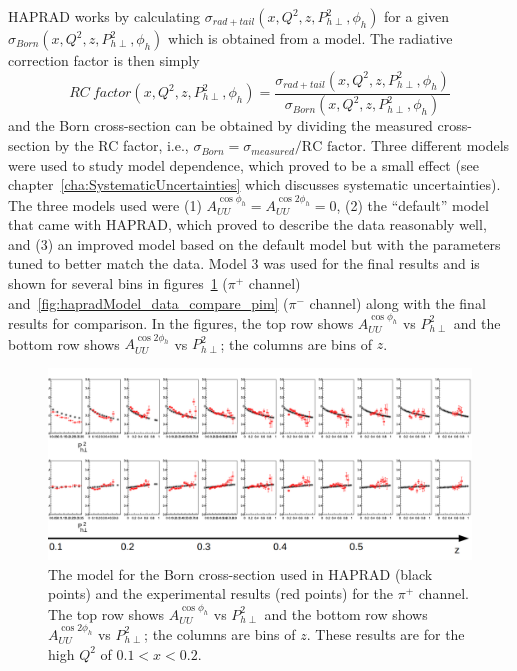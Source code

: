 HAPRAD works by calculating $\sigma_{rad+tail} \left( x, Q^2, z, P_{h\perp}^2, \phi_h \right)$ for a given \allowbreak $\sigma_{Born} \left( x, Q^2, z, P_{h\perp}^2, \phi_h \right)$ which is obtained from a model.
The radiative correction factor is then simply
\begin{equation}
\label{eq:RCfactor}
RC\ factor \left( x, Q^2, z, P_{h\perp}^2, \phi_h \right) = \frac{\sigma_{rad+tail} \left( x, Q^2, z, P_{h\perp}^2, \phi_h \right)}{\sigma_{Born} \left( x, Q^2, z, P_{h\perp}^2, \phi_h \right)}
\end{equation}
and the Born cross-section can be obtained by dividing the measured cross-section by the RC factor, i.e., $\sigma_{Born} = \sigma_{measured}/\text{RC factor}$.
Three different models were used to study model dependence, which proved to be a small effect (see chapter~\ref{cha:SystematicUncertainties} which discusses systematic uncertainties).
The three models used were (1) $A_{UU}^{\cos \phi_h} = A_{UU}^{\cos 2\phi_h} = 0$, (2) the ``default'' model that came with HAPRAD, which proved to describe the data reasonably well, and (3) an improved model based on the default model but with the parameters tuned to better match the data.
Model 3 was used for the final results and is shown for several bins in figures~\ref{fig:hapradModel_data_compare_pip} ($\pi^+$ channel) and~\ref{fig:hapradModel_data_compare_pim} ($\pi^-$ channel) along with the final results for comparison.
In the figures, the top row shows $A_{UU}^{\cos \phi_h}$ vs $P_{h\perp}^2$ and the bottom row shows $A_{UU}^{\cos 2\phi_h}$ vs $P_{h\perp}^2$; the columns are bins of $z$.
%
\begin{figure}
\centering
\includegraphics[width=8.5in]{figures/hapradModel_data_compare_pip.pdf}
\caption{The model for the Born cross-section used in HAPRAD (black points) and the experimental results (red points) for the $\pi^+$ channel. The top row shows $A_{UU}^{\cos \phi_h}$ vs $P_{h\perp}^2$ and the bottom row shows $A_{UU}^{\cos 2\phi_h}$ vs $P_{h\perp}^2$; the columns are bins of $z$. These results are for the high $Q^2$ of $ 0.1 < x < 0.2$.}
\label{fig:hapradModel_data_compare_pip}
\end{figure}
